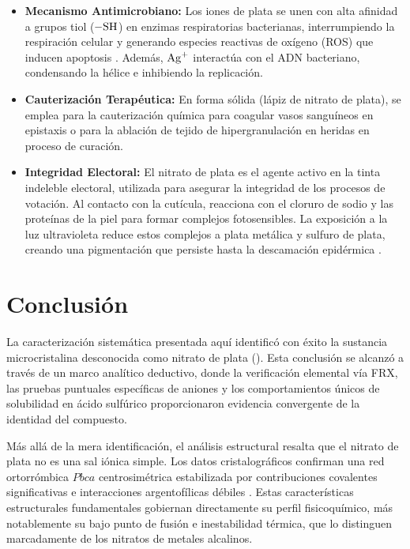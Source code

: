 \documentclass[pdflatex,sn-mathphys-num,draft]{sn-jnl}
\theoremstyle{thmstyleone}%
\theoremstyle{thmstyletwo}%
\theoremstyle{thmstylethree}%
\begin{document}
\begin{itemize}
  \item \textbf{Mecanismo Antimicrobiano:} Los iones de plata se unen con alta
    afinidad a grupos tiol ($\ce{-SH}$) en enzimas respiratorias bacterianas,
    interrumpiendo la respiración celular y generando especies reactivas de
    oxígeno (ROS) que inducen apoptosis \cite{Morones2005, Pandian2010}. Además,
    $\ce{Ag+}$ interactúa con el ADN bacteriano, condensando la hélice e
    inhibiendo la replicación.

  \item \textbf{Cauterización Terapéutica:} En forma sólida (lápiz de nitrato
    de plata), se emplea para la cauterización química para coagular vasos
    sanguíneos en epistaxis o para la ablación de tejido de hipergranulación en
    heridas en proceso de curación.

  \item \textbf{Integridad Electoral:} El nitrato de plata es el agente activo
    en la tinta indeleble electoral, utilizada para asegurar la integridad de
    los procesos de votación. Al contacto con la cutícula, reacciona con el
    cloruro de sodio y las proteínas de la piel para formar complejos
    fotosensibles. La exposición a la luz ultravioleta reduce estos complejos a
    plata metálica y sulfuro de plata, creando una pigmentación que persiste
    hasta la descamación epidérmica \cite{Nandwani2025}.
\end{itemize}

\section{Conclusión}
\label{sec:conclusion}

La caracterización sistemática presentada aquí identificó con éxito la sustancia
microcristalina desconocida como nitrato de plata (). Esta conclusión
se alcanzó a través de un marco analítico deductivo, donde la verificación
elemental vía FRX, las pruebas puntuales específicas de aniones y los
comportamientos únicos de solubilidad en ácido sulfúrico proporcionaron
evidencia convergente de la identidad del compuesto.

Más allá de la mera identificación, el análisis estructural resalta que el
nitrato de plata no es una sal iónica simple. Los datos cristalográficos
confirman una red ortorrómbica $Pbca$ centrosimétrica estabilizada por
contribuciones covalentes significativas  e interacciones
argentofílicas débiles . Estas características estructurales
fundamentales gobiernan directamente su perfil fisicoquímico, más notablemente
su bajo punto de fusión e inestabilidad térmica, que lo distinguen marcadamente
de los nitratos de metales alcalinos.
\end{document}
